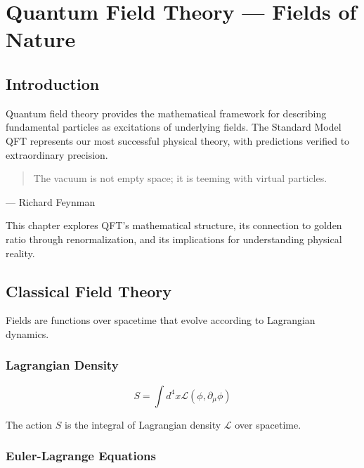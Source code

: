\chapter{Quantum Field Theory — Fields of Nature}
\label{ch:21}

\section{Introduction}

Quantum field theory provides the mathematical framework for describing fundamental particles as excitations of underlying fields. The Standard Model QFT represents our most successful physical theory, with predictions verified to extraordinary precision.

\begin{quote}
The vacuum is not empty space; it is teeming with virtual particles.
\end{quote}
— Richard Feynman

This chapter explores QFT's mathematical structure, its connection to golden ratio through renormalization, and its implications for understanding physical reality.

\section{Classical Field Theory}

Fields are functions over spacetime that evolve according to Lagrangian dynamics.

\subsection{Lagrangian Density}

\begin{definition}[Lagrangian]
\label{def:lagrangian}
\begin{equation}
S = \int d^4x \mathcal{L}(\phi, \partial_\mu\phi)
\end{equation}

The action $S$ is the integral of Lagrangian density $\mathcal{L}$ over spacetime.
\end{definition}

\subsection{Euler-Lagrange Equations}

